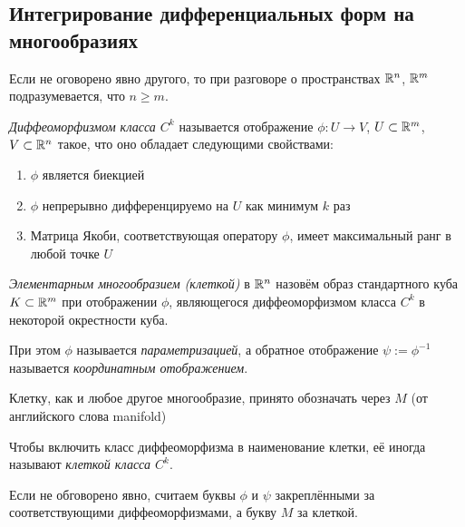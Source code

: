 \subsection{Интегрирование дифференциальных форм на многообразиях}

\begin{note}
	Если не оговорено явно другого, то при разговоре о пространствах $\mathbb{R}^n$, $\mathbb{R}^m$ подразумевается, что $n \ge m$.
\end{note}

\begin{definition}
	\textit{Диффеоморфизмом класса $C^k$} называется отображение $\phi \colon U \to V$, $U \subset \mathbb{R}^m$, $V \subset \mathbb{R}^n$ такое, что оно обладает следующими свойствами:
	\begin{enumerate}
		\item $\phi$ является биекцией
		
		\item $\phi$ непрерывно дифференцируемо на $U$ как минимум $k$ раз
		
		\item Матрица Якоби, соответствующая оператору $\phi$, имеет максимальный ранг в любой точке $U$
	\end{enumerate}
\end{definition}

\begin{definition}
	\textit{Элементарным многообразием (клеткой)} в $\mathbb{R}^n$ назовём образ стандартного куба $K \subset \mathbb{R}^m$ при отображении $\phi$, являющегося диффеоморфизмом класса $C^k$ в некоторой окрестности куба.
	
	При этом $\phi$ называется \textit{параметризацией}, а обратное отображение $\psi := \phi^{-1}$ называется \textit{координатным отображением}.
\end{definition}

\begin{note}
	Клетку, как и любое другое многообразие, принято обозначать через $M$ (от английского слова manifold)
\end{note}

\begin{note}
	Чтобы включить класс диффеоморфизма в наименование клетки, её иногда называют \textit{клеткой класса $C^k$}.
\end{note}

\begin{note}
	Если не обговорено явно, считаем буквы $\phi$ и $\psi$ закреплёнными за соответствующими диффеоморфизмами, а букву $M$ за клеткой.
\end{note}

